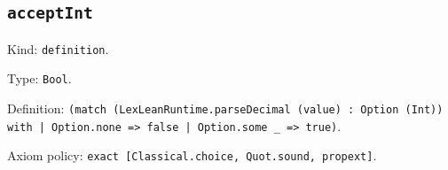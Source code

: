 \documentclass[11pt]{article}
\begin{document}
\subsection*{\texttt{acceptInt}}
\noindent Kind: \texttt{definition}.\par
\noindent Type: \texttt{Bool}.\par
\noindent Definition: \texttt{(match (LexLeanRuntime.parseDecimal (value) : Option (Int)) with | Option.none => false | Option.some \_ => true)}.\par
\noindent Axiom policy: \texttt{exact [Classical.choice, Quot.sound, propext]}.\par
\end{document}
